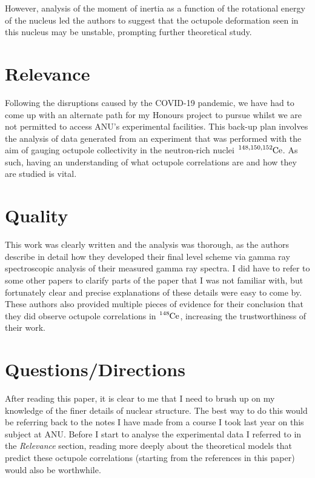 \documentclass[12pt,a4paper]{article}
\begin{document}
\medskip
However, analysis of the moment of inertia as a function of the rotational energy of the nucleus led the authors to suggest that the octupole deformation seen in this nucleus may be unstable, prompting further theoretical study. 

\section*{Relevance}
Following the disruptions caused by the COVID-19 pandemic, we have had to come up with an alternate path for my Honours project to pursue whilst we are not permitted to access ANU's experimental facilities. This back-up plan involves the analysis of data generated from an experiment that was performed with the aim of gauging octupole collectivity in the neutron-rich nuclei $\ce{^{148,150,152}Ce}$. As such, having an understanding of what octupole correlations are and how they are studied is vital.

\section*{Quality}
This work was clearly written and the analysis was thorough, as the authors describe in detail how they developed their final level scheme via gamma ray spectroscopic analysis of their measured gamma ray spectra. I did have to refer to some other papers to clarify parts of the paper that I was not familiar with, but fortunately clear and precise explanations of these details were easy to come by. These authors also provided multiple pieces of evidence for their conclusion that they did observe octupole correlations in $\ce{^{148}Ce}$, increasing the trustworthiness of their work.

\section*{Questions/Directions}
After reading this paper, it is clear to me that I need to brush up on my knowledge of the finer details of nuclear structure. The best way to do this would be referring back to the notes I have made from a course I took last year on this subject at ANU. Before I start to analyse the experimental data I referred to in the \textit{Relevance} section, reading more deeply about the theoretical models that predict these octupole correlations (starting from the references in this paper) would also be worthwhile.

\vspace*{-\baselineskip}

{}
\end{document}
